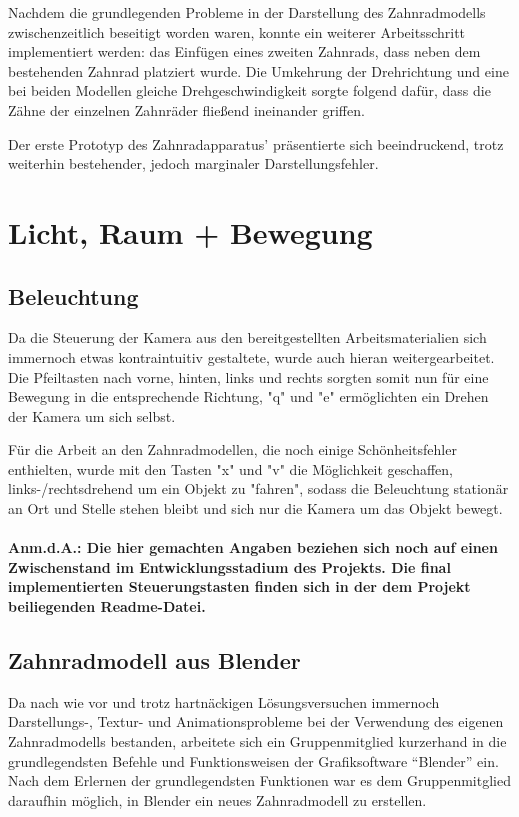 \documentclass{article}
\begin{document}
Nachdem die grundlegenden Probleme in der Darstellung des Zahnradmodells zwischenzeitlich beseitigt worden waren, konnte ein weiterer Arbeitsschritt implementiert werden: 
das Einfügen eines zweiten Zahnrads, dass neben dem bestehenden Zahnrad platziert wurde. 
Die Umkehrung der Drehrichtung und eine bei beiden Modellen gleiche Drehgeschwindigkeit sorgte folgend dafür, dass die Zähne der einzelnen Zahnräder fließend ineinander griffen. 

Der erste Prototyp des Zahnradapparatus' präsentierte sich beeindruckend, trotz weiterhin bestehender, jedoch marginaler Darstellungsfehler. 





\section{Licht, Raum + Bewegung}



\subsection{Beleuchtung}
Da die Steuerung der Kamera aus den bereitgestellten Arbeitsmaterialien sich immernoch  etwas kontraintuitiv gestaltete, wurde auch hieran weitergearbeitet. 
Die Pfeiltasten nach vorne, hinten, links und rechts sorgten somit nun für eine Bewegung in die entsprechende Richtung, "q" und "e" ermöglichten ein Drehen der Kamera um sich selbst. 

Für die Arbeit an den Zahnradmodellen, die noch einige Schönheitsfehler enthielten, wurde mit den Tasten "x" und "v" die Möglichkeit geschaffen, links-/rechtsdrehend um ein Objekt zu "fahren", sodass die Beleuchtung stationär an Ort und Stelle stehen bleibt und sich nur die Kamera um das Objekt bewegt. 

\paragraph{Anm.d.A.: 
Die hier gemachten Angaben beziehen sich noch auf einen Zwischenstand im Entwicklungsstadium des Projekts. 
Die final implementierten Steuerungstasten finden sich in der dem Projekt beiliegenden Readme-Datei. 
}



\subsection{Zahnradmodell aus Blender}
Da nach wie vor und trotz hartnäckigen Lösungsversuchen immernoch Darstellungs-, Textur- und Animationsprobleme bei der Verwendung des eigenen Zahnradmodells bestanden, arbeitete sich ein Gruppenmitglied kurzerhand in die grundlegendsten Befehle und Funktionsweisen der Grafiksoftware \enquote{Blender} ein. 
Nach dem Erlernen der grundlegendsten Funktionen war es dem Gruppenmitglied daraufhin möglich, in Blender ein neues Zahnradmodell zu erstellen. 
\end{document}
